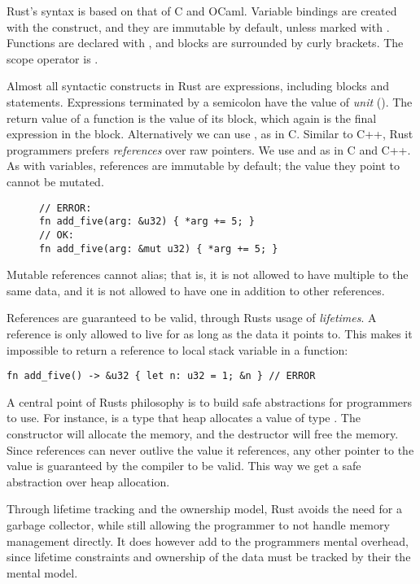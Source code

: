\documentclass[a4paper,twoside]{report}
\begin{document}
Rust's syntax is based on that of C and OCaml.  Variable bindings are created
with the  construct, and they are immutable by default, unless marked
with .  Functions are declared with , and blocks are
surrounded by curly brackets.  The scope operator is \code{::}.

Almost all syntactic constructs in Rust are expressions, including blocks and
 statements.  Expressions terminated by a semicolon have the value of
\emph{unit} (\code{()}).  The return value of a function is the value of its
block, which again is the final expression in the block. Alternatively we can
use , as in C.  Similar to C++, Rust programmers prefers
\emph{references} over raw pointers.  We use \code{\&} and \code{*} as in C and
C++.  As with variables, references are immutable by default; the value they
point to cannot be mutated.

\begin{figure}
\begin{lstlisting}[firstnumber=last]
// ERROR:
fn add_five(arg: &u32) { *arg += 5; }
// OK:
fn add_five(arg: &mut u32) { *arg += 5; }
\end{lstlisting}
\end{figure}

Mutable references cannot alias; that is, it is not allowed to have multiple
 to the same data, and it is not allowed to have one 
in addition to other references.

References are guaranteed to be valid, through Rusts usage of
\emph{lifetimes}.  A reference is only allowed to live for as long as the data
it points to.  This makes it impossible to return a reference to local stack
variable in a function:
\begin{lstlisting}[firstnumber=last]
fn add_five() -> &u32 { let n: u32 = 1; &n } // ERROR
\end{lstlisting}

A central point of Rusts philosophy is to build safe abstractions for
programmers to use.  For instance,  is a type that heap
allocates a value of type .  The constructor will allocate the memory,
and the destructor will free the memory.  Since references can never outlive
the value it references, any other pointer to the value is guaranteed by the
compiler to be valid.  This way we get a safe abstraction over heap allocation.

Through lifetime tracking and the ownership model, Rust avoids the need for a
garbage collector, while still allowing the programmer to not handle memory
management directly. It does however add to the programmers mental overhead,
since lifetime constraints and ownership of the data must be tracked by their
the mental model.
\end{document}
